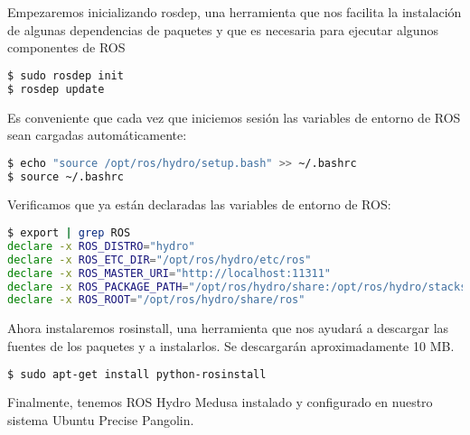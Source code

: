 Empezaremos inicializando rosdep, una herramienta que nos facilita la instalación de algunas dependencias de paquetes y que es necesaria para ejecutar algunos componentes de ROS

\begin{lstlisting}[language = bash]
$ sudo rosdep init
$ rosdep update
\end{lstlisting}

Es conveniente que cada vez que iniciemos sesión las variables de entorno de ROS sean cargadas automáticamente:

\begin{lstlisting}[language = bash]
$ echo "source /opt/ros/hydro/setup.bash" >> ~/.bashrc
$ source ~/.bashrc
\end{lstlisting}

Verificamos que ya están declaradas las variables de entorno de ROS:

\begin{lstlisting}[language = bash]
$ export | grep ROS
declare -x ROS_DISTRO="hydro"
declare -x ROS_ETC_DIR="/opt/ros/hydro/etc/ros"
declare -x ROS_MASTER_URI="http://localhost:11311"
declare -x ROS_PACKAGE_PATH="/opt/ros/hydro/share:/opt/ros/hydro/stacks"
declare -x ROS_ROOT="/opt/ros/hydro/share/ros"
\end{lstlisting}

Ahora instalaremos rosinstall, una herramienta que nos ayudará a descargar las fuentes de los paquetes y a instalarlos. Se descargarán aproximadamente 10 MB.

\begin{lstlisting}[language = bash]
$ sudo apt-get install python-rosinstall
\end{lstlisting}

Finalmente, tenemos ROS Hydro Medusa instalado y configurado en nuestro sistema Ubuntu Precise Pangolin.
